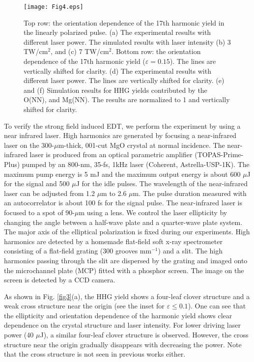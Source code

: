 \documentclass[aps,prl,10pt,preprint,nofootinbib]{revtex4-1}
\begin{document}
\begin{figure}[!t]
	\texttt{[image: Fig4.eps]}
	\caption{Top row: the orientation dependence of the 17th harmonic yield in the linearly polarized pulse. (a) The experimental results with different laser power. The simulated results with laser intensity (b) 3 TW/cm$^{2}$, and (c) 7 TW/cm$^{2}$. Bottom row: the orientation dependence of the 17th harmonic yield ($\varepsilon=0.15$). The lines are vertically shifted for clarity. (d) The experimental results with different laser power. The lines are vertically shifted for clarity. (e) and (f) Simulation results for HHG yields contributed by the O(NN), and Mg(NN). The results are normalized to 1 and vertically shifted for clarity.}\label{fig4}
\end{figure}

To verify the strong field induced EDT, we perform the experiment by using a near infrared laser. High harmonics are generated by focusing a near-infrared laser on the 300-$\mu$m-thick, 001-cut MgO crystal at normal incidence. The near-infrared laser is produced from an optical parametric amplifier (TOPAS-Prime-Plus) pumped by an 800-nm, 35-fs, 1kHz laser (Coherent, Astrella-USP-1K). The maximum pump energy is 5 mJ and the maximum output energy is about 600 $\mu$J for the signal and 500 $\mu$J for the idle pulses. The wavelength of the near-infrared laser can be adjusted from 1.2 $\mu$m to 2.6 $\mu$m. The pulse duration measured with an autocorrelator is about 100 fs for the signal pulse. The near-infrared laser is focused to a spot of 90-$\mu$m using a lens. We control the laser ellipticity by changing the angle between a half-wave plate and a quarter-wave plate system. The major axis of the elliptical polarization is fixed during our experiments. High harmonics are detected by a homemade flat-field soft x-ray spectrometer consisting of a flat-field grating ($300$ grooves mm$^{-1}$) and a slit. The high harmonics passing through the slit are dispersed by the grating and imaged onto the microchannel plate (MCP) fitted with a phosphor screen. The image on the screen is detected by a CCD camera. 

As shown in Fig. \ref{fig3}(a), the HHG yield shows a four-leaf clover structure and a weak cross structure near the origin (see the inset for $\varepsilon\le0.1$). One can see that the ellipticity and orientation dependence of the harmonic yield shows clear dependence on the crystal structure and laser intensity. For lower driving laser power (40 $\mu$J), a similar four-leaf clover structure is observed. However, the cross structure near the origin gradually disappears with decreasing the power. Note that the cross structure is not seen in previous works \cite{You2016} either. 
\end{document}
